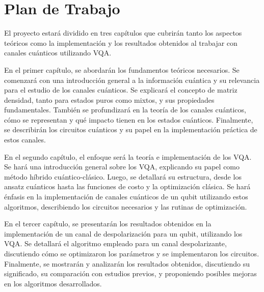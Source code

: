 \section{Plan de Trabajo}

El proyecto estará dividido en tres capítulos que cubrirán tanto los aspectos teóricos como la implementación y los resultados obtenidos al trabajar con canales cuánticos utilizando VQA.

En el primer capítulo, se abordarán los fundamentos teóricos necesarios. Se comenzará con una introducción general a la información cuántica y su relevancia para el estudio de los canales cuánticos. Se explicará el concepto de matriz densidad, tanto para estados puros como mixtos, y sus propiedades fundamentales. También se profundizará en la teoría de los canales cuánticos, cómo se representan y qué impacto tienen en los estados cuánticos. Finalmente, se describirán los circuitos cuánticos y su papel en la implementación práctica de estos canales.

En el segundo capítulo, el enfoque será la teoría e implementación de los VQA. Se hará una introducción general sobre los VQA, explicando su papel como método híbrido cuántico-clásico. Luego, se detallará su estructura, desde los ansatz cuánticos hasta las funciones de costo y la optimización clásica. Se hará énfasis en la implementación de canales cuánticos de un qubit utilizando estos algoritmos, describiendo los circuitos necesarios y las rutinas de optimización.

En el tercer capítulo, se presentarán los resultados obtenidos en la implementación de un canal de despolarización para un qubit, utilizando los VQA. Se detallará el algoritmo empleado para un canal despolarizante, discutiendo cómo se optimizaron los parámetros y se implementaron los circuitos. Finalmente, se mostrarán y analizarán los resultados obtenidos, discutiendo su significado, su comparación con estudios previos, y proponiendo posibles mejoras en los algoritmos desarrollados.

